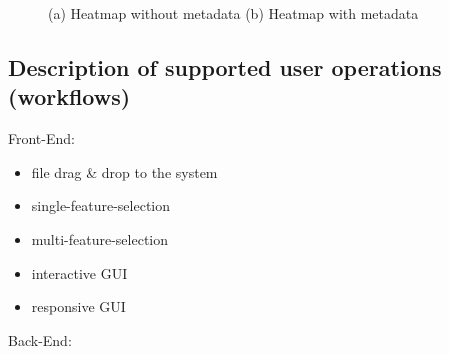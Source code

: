 \documentclass[runningheads]{llncs}
\begin{document}
\begin{itemize}
\begin{figure}
        \caption{(a) Heatmap without metadata (b) Heatmap with metadata}
        \label{fig:metdata}
    \end{figure}
\end{itemize}



\subsection{Description of supported user operations (workflows)}
Front-End:
\begin{itemize}
    \item file drag \& drop to the system
    \item single-feature-selection
    \item multi-feature-selection
    \item interactive GUI
    \item responsive GUI
\end{itemize}
Back-End:
\end{document}
